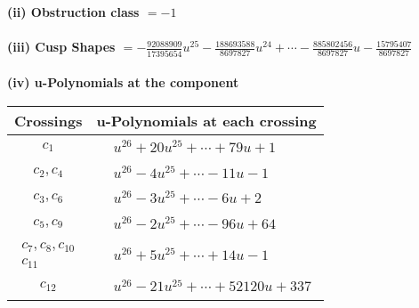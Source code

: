 \documentclass[1p]{elsarticle_modified}
\theoremstyle{definition}
\begin{document}
\flushleft \textbf{(ii) Obstruction class $= -1$}\\~\\
\flushleft \textbf{(iii) Cusp Shapes $= -\frac{92088909}{17395654} u^{25}-\frac{188693588}{8697827} u^{24}+\cdots-\frac{885802456}{8697827} u-\frac{15795407}{8697827}$}\\~\\
\newpage\renewcommand{\arraystretch}{1}
\flushleft \textbf{(iv) u-Polynomials at the component}\newline \\
\begin{tabular}{m{50pt}|m{274pt}}
Crossings & \hspace{64pt}u-Polynomials at each crossing \\
\hline $$\begin{aligned}c_{1}\end{aligned}$$&$\begin{aligned}
&u^{26}+20 u^{25}+\cdots+79 u+1
\end{aligned}$\\
\hline $$\begin{aligned}c_{2},c_{4}\end{aligned}$$&$\begin{aligned}
&u^{26}-4 u^{25}+\cdots-11 u-1
\end{aligned}$\\
\hline $$\begin{aligned}c_{3},c_{6}\end{aligned}$$&$\begin{aligned}
&u^{26}-3 u^{25}+\cdots-6 u+2
\end{aligned}$\\
\hline $$\begin{aligned}c_{5},c_{9}\end{aligned}$$&$\begin{aligned}
&u^{26}-2 u^{25}+\cdots-96 u+64
\end{aligned}$\\
\hline $$\begin{aligned}c_{7},c_{8},c_{10}\\c_{11}\end{aligned}$$&$\begin{aligned}
&u^{26}+5 u^{25}+\cdots+14 u-1
\end{aligned}$\\
\hline $$\begin{aligned}c_{12}\end{aligned}$$&$\begin{aligned}
&u^{26}-21 u^{25}+\cdots+52120 u+337
\end{aligned}$\\
\hline
\end{tabular}\\~\\
\end{document}
